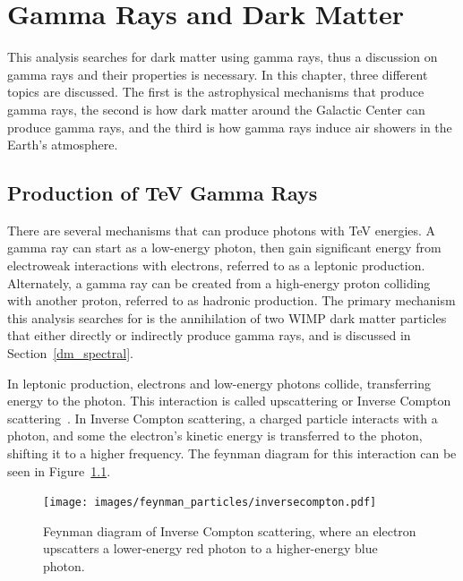 \cleartooddpage[\thispagestyle{empty}]

\newcommand{\Lim}[1]{\raisebox{0.5ex}{\scalebox{0.8}{$\displaystyle \lim_{#1}\;$}}}
\renewcommand{\labelitemi}{\textbullet}

\chapter{Gamma Rays and Dark Matter}\label{ch_gamma}


This analysis searches for dark matter using gamma rays, thus a discussion on gamma rays and their properties is necessary.
In this chapter, three different topics are discussed.
The first is the astrophysical mechanisms that produce gamma rays, the second is how dark matter around the Galactic Center can produce gamma rays, and the third is how gamma rays induce air showers in the Earth's atmosphere.

\section{Production of TeV Gamma Rays}

  There are several mechanisms that can produce photons with TeV energies.
  A gamma ray can start as a low-energy photon, then gain significant energy from electroweak interactions with electrons, referred to as a leptonic production.
  Alternately, a gamma ray can be created from a high-energy proton colliding with another proton, referred to as hadronic production.
  The primary mechanism this analysis searches for is the annihilation of two WIMP dark matter particles that either directly or indirectly produce gamma rays, and is discussed in Section~\ref{dm_spectral}.

  In leptonic production, electrons and low-energy photons collide, transferring energy to the photon.
  This interaction is called upscattering or Inverse Compton scattering~\cite{compton_effect}.
  In Inverse Compton scattering, a charged particle interacts with a photon, and some the electron's kinetic energy is transferred to the photon, shifting it to a higher frequency.
  The feynman diagram for this interaction can be seen in Figure~\ref{fig:inv_compt_feyn}.
  
  \begin{figure}[ht]
    \centering
    \texttt{[image: images/feynman\_particles/inversecompton.pdf]}
    \caption[Inverse Compton Scattering Feynman Diagram]{
      Feynman diagram of Inverse Compton scattering, where an electron upscatters a lower-energy red photon to a higher-energy blue photon.
    }
    \label{fig:inv_compt_feyn}
  \end{figure}
  \FloatBarrier
  
